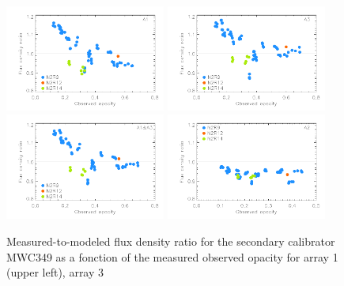 \begin{figure}[ht!]
  \begin{center}
    \includegraphics[clip=true,width=0.47\textwidth]{Figures/Calibration/plot_flux_density_ratio_MWC349_obstau_secondary_a1.pdf}
    \includegraphics[clip=true,width=0.47\textwidth]{Figures/Calibration/plot_flux_density_ratio_MWC349_obstau_secondary_a3.pdf}
    \includegraphics[clip=true,width=0.47\textwidth]{Figures/Calibration/plot_flux_density_ratio_MWC349_obstau_secondary_1mm.pdf}
    \includegraphics[clip=true,width=0.47\textwidth]{Figures/Calibration/plot_flux_density_ratio_MWC349_obstau_secondary_a2.pdf}
    \caption[MWC349 flux density stability against observed
      opacity]{Measured-to-modeled flux density ratio for the
      secondary calibrator MWC349 as a fonction
      of the measured observed opacity for array 1 (upper left), array 3
}
\end{center}
\end{figure}
